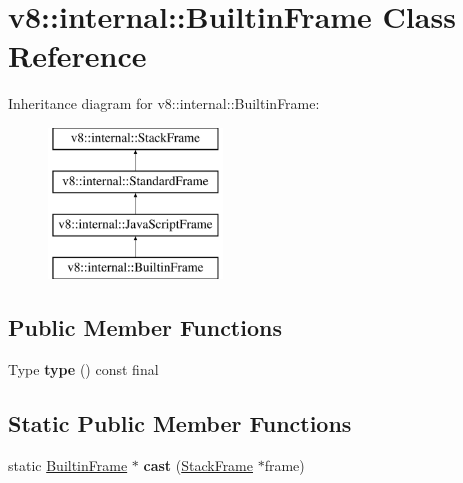 \hypertarget{classv8_1_1internal_1_1BuiltinFrame}{}\section{v8\+:\+:internal\+:\+:Builtin\+Frame Class Reference}
\label{classv8_1_1internal_1_1BuiltinFrame}
Inheritance diagram for v8\+:\+:internal\+:\+:Builtin\+Frame\+:\begin{figure}[H]
\begin{center}
\leavevmode
\includegraphics[height=4.000000cm]{classv8_1_1internal_1_1BuiltinFrame}
\end{center}
\end{figure}
\subsection*{Public Member Functions}
\begin{DoxyCompactItemize}
\item 
\mbox{\label{classv8_1_1internal_1_1BuiltinFrame_a52163399ae0426e620d0ca68d32b0037}} 
Type {\bfseries type} () const final
\end{DoxyCompactItemize}
\subsection*{Static Public Member Functions}
\begin{DoxyCompactItemize}
\item 
\mbox{\label{classv8_1_1internal_1_1BuiltinFrame_a342c47dd1ad15d8dcfddff0f535c3b61}} 
static \mbox{\hyperlink{classv8_1_1internal_1_1BuiltinFrame}{Builtin\+Frame}} $\ast$ {\bfseries cast} (\mbox{\hyperlink{classv8_1_1internal_1_1StackFrame}{Stack\+Frame}} $\ast$frame)
\end{DoxyCompactItemize}
